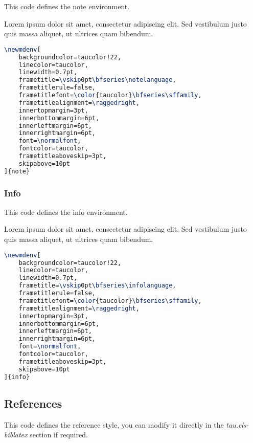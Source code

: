 \documentclass[9pt,a4paper,twoside]{tau}
\begin{document}
            This code defines the note environment.

  		\begin{note}
                Lorem ipsum dolor sit amet, consectetur adipiscing elit. Sed vestibulum justo quis massa aliquet, ut ultrices quam bibendum.
		\end{note}
		
\begin{lstlisting}[language=TeX, caption=Note environment code.]
\newmdenv[
	backgroundcolor=taucolor!22, 						
	linecolor=taucolor,									
	linewidth=0.7pt,
	frametitle=\vskip0pt\bfseries\notelanguage,
	frametitlerule=false,
	frametitlefont=\color{taucolor}\bfseries\sffamily,
	frametitlealignment=\raggedright,
	innertopmargin=3pt,
	innerbottommargin=6pt,
	innerleftmargin=6pt,
	innerrightmargin=6pt,
	font=\normalfont,
	fontcolor=taucolor,									
	frametitleaboveskip=3pt,
	skipabove=10pt
]{note} \end{lstlisting}

        \subsubsection{Info}

            This code defines the info environment.

    	\begin{info}
                Lorem ipsum dolor sit amet, consectetur adipiscing elit. Sed vestibulum justo quis massa aliquet, ut ultrices quam bibendum.
		\end{info}
		
\begin{lstlisting}[language=TeX, caption=Info environment code.]
\newmdenv[
	backgroundcolor=taucolor!22, 						
	linecolor=taucolor,									
	linewidth=0.7pt,
	frametitle=\vskip0pt\bfseries\infolanguage,
	frametitlerule=false,
	frametitlefont=\color{taucolor}\bfseries\sffamily,
	frametitlealignment=\raggedright,
	innertopmargin=3pt,
	innerbottommargin=6pt,
	innerleftmargin=6pt,
	innerrightmargin=6pt,
	font=\normalfont,
	fontcolor=taucolor,									
	frametitleaboveskip=3pt,
	skipabove=10pt
]{info} \end{lstlisting}

    \subsection{References}

        This code defines the reference style, you can modify it directly in the \textit{tau.cls-biblatex} section if required.
\end{document}
